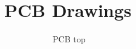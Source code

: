\section{PCB Drawings}
\label{sec:PCB Drawings}
\begin{figure}[H]
\begin{subfigure}{0.24\textwidth}
\caption{PCB top}
\end{subfigure}
\begin{subfigure}{0.24\textwidth}
\framebox{
}
\end{subfigure}
\end{figure}
